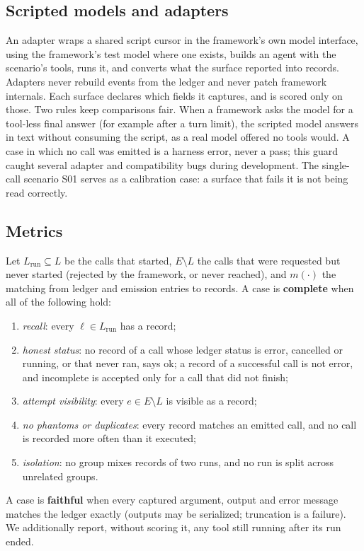 \documentclass[10pt]{article}
\begin{document}
\subsection{Scripted models and adapters}
An adapter wraps a shared script cursor in the framework's own model interface, using the framework's test model where one exists, builds an agent with the scenario's tools, runs it, and converts what the surface reported into records. Adapters never rebuild events from the ledger and never patch framework internals. Each surface declares which fields it captures, and is scored only on those. Two rules keep comparisons fair. When a framework asks the model for a tool-less final answer (for example after a turn limit), the scripted model answers in text without consuming the script, as a real model offered no tools would. A case in which no call was emitted is a harness error, never a pass; this guard caught several adapter and compatibility bugs during development. The single-call scenario S01 serves as a calibration case: a surface that fails it is not being read correctly.

\subsection{Metrics}
Let $L_{\text{run}} \subseteq L$ be the calls that started, $E \setminus L$ the calls that were requested but never started (rejected by the framework, or never reached), and $m(\cdot)$ the matching from ledger and emission entries to records. A case is \textbf{complete} when all of the following hold:
\begin{enumerate}[label=(C\arabic*)]
\item \emph{recall}: every $\ell \in L_{\text{run}}$ has a record;
\item \emph{honest status}: no record of a call whose ledger status is \textsf{error}, \textsf{cancelled} or \textsf{running}, or that never ran, says \textsf{ok}; a record of a successful call is not \textsf{error}, and \textsf{incomplete} is accepted only for a call that did not finish;
\item \emph{attempt visibility}: every $e \in E \setminus L$ is visible as a record;
\item \emph{no phantoms or duplicates}: every record matches an emitted call, and no call is recorded more often than it executed;
\item \emph{isolation}: no group mixes records of two runs, and no run is split across unrelated groups.
\end{enumerate}
A case is \textbf{faithful} when every captured argument, output and error message matches the ledger exactly (outputs may be serialized; truncation is a failure). We additionally report, without scoring it, any tool still running after its run ended.
\end{document}
